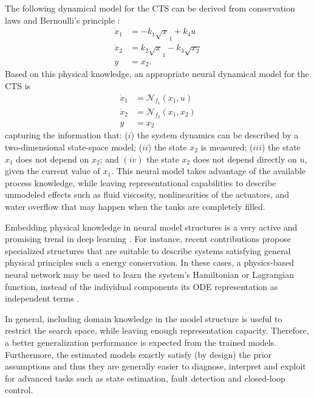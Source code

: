 \documentclass{article} %
\newcommand{\NN}{\mathcal{N}} %
\begin{document}
The following dynamical model for the CTS can be derived from conservation laws and Bernoulli's principle \cite{schoukens2017three}:
\begin{subequations}
\label{eq:CTS}
\begin{align}
 \dot x_1 &= -k_1 \sqrt x_1 + k_4 u\\
 \dot x_2 &= k_2\sqrt x_1 - k_3 \sqrt{x_2}\\
      y   &= x_2.
\end{align}
\end{subequations}
Based on this physical knowledge, an appropriate neural dynamical model for the CTS is
\begin{subequations}
\label{eq:neural_CTS}
\begin{align}
 \dot x_1 &= \NN_{\!f_1}(x_1, u) \\
 \dot x_2 &= \NN_{\!f_2}(x_1, x_2) \\
      y   &= x_2
\end{align}
\end{subequations}
capturing the information that: ($i$) the system dynamics can be described by a two-dimensional state-space model; ($ii$) the state $x_2$ is measured; ($iii$) the  state $x_1$ does not depend on $x_2$; and $(iv)$ the state $x_2$  does not depend directly on $u$, given the current value of $x_1$.
This neural model takes advantage of the available process knowledge, while leaving representational capabilities to describe unmodeled effects such as  fluid viscosity,  nonlinearities of the actuators, and water overflow that may happen when the tanks are completely filled. 

Embedding physical knowledge in neural model structures is a very active and promising trend in deep learning \citep{raissi2019physics}.
For instance, recent contributions propose specialized structures that are suitable to describe systems satisfying general physical principles such a energy conservation.
In these cases, a physics-based neural network may be used to learn the system's Hamiltonian or Lagrangian function, instead of the individual components its ODE representation as independent terms \citep{greydanus2019hamiltonian, lutter2019deep}. %

In general, including domain knowledge in the model structure is useful to restrict the search space, while leaving enough representation capacity.
Therefore, a better generalization performance is expected from the trained models. Furthermore, the estimated models exactly satisfy (by design) the prior assumptions and thus they are generally easier to diagnose, interpret and exploit for advanced tasks such as state estimation, fault detection and closed-loop control.
\end{document}
